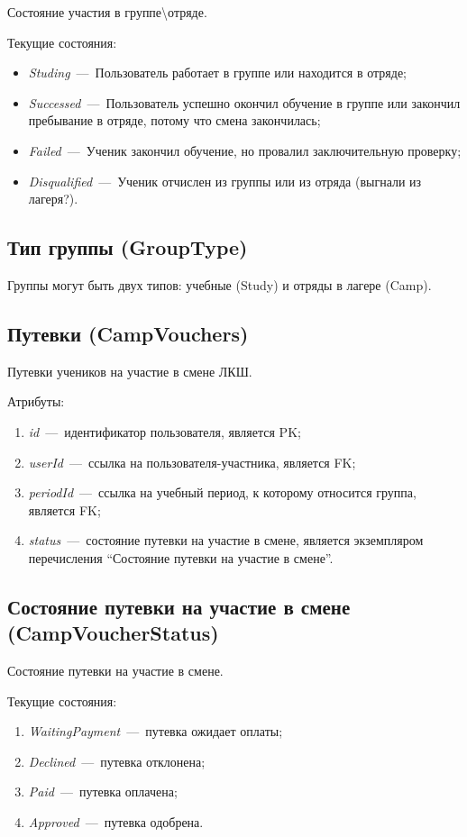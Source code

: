 \documentclass[14pt]{article}
\begin{document}
Состояние участия в группе\textbackslash отряде.

Текущие состояния:
\begin{itemize}
	\item \emph{Studing}~---~Пользователь работает в группе или находится в отряде; 
	\item \emph{Successed}~---~Пользователь успешно окончил обучение в группе или закончил пребывание в отряде, потому что смена закончилась;
	\item \emph{Failed}~---~Ученик закончил обучение, но провалил заключительную проверку;
	\item \emph{Disqualified}~---~Ученик отчислен из группы или из отряда (выгнали из лагеря?).
\end{itemize}

\subsection{Тип группы (GroupType)}

Группы могут быть двух типов: учебные (Study) и отряды в лагере (Camp).

\subsection{Путевки (CampVouchers)}

Путевки учеников на участие в смене ЛКШ.

Атрибуты:
\begin{enumerate}
	\item \emph{id}~---~идентификатор пользователя, является PK; 
	\item \emph{userId}~---~ссылка на пользователя-участника, является FK;
	\item \emph{periodId}~---~ссылка на учебный период, к которому относится группа, является FK;
	\item \emph{status}~---~состояние путевки на участие в смене, является экземпляром перечисления ``Состояние путевки на участие в смене''. 
\end{enumerate}

\subsection{Состояние путевки на участие в смене (CampVoucherStatus)}

Состояние путевки на участие в смене.

Текущие состояния:

\begin{enumerate}
	\item \emph{WaitingPayment}~---~путевка ожидает оплаты;
	\item \emph{Declined}~---~путевка отклонена;
	\item \emph{Paid}~---~путевка оплачена;
	\item \emph{Approved}~---~путевка одобрена.
\end{enumerate}
\end{document}
